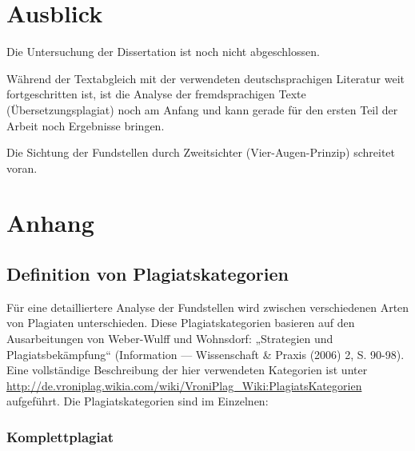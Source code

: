 \documentclass[ngerman,final,fontsize=12pt,paper=a4,twoside,bibliography=totoc,BCOR=8mm,draft=false]{scrartcl}
\begin{document}
\section{%
 Ausblick }

Die Untersuchung der Dissertation ist noch nicht abgeschlossen. 


Während der Textabgleich mit der verwendeten deutschsprachigen Literatur weit fortgeschritten ist, ist die Analyse der fremdsprachigen Texte (Übersetzungsplagiat) noch am Anfang und kann gerade für den ersten Teil der Arbeit noch Ergebnisse bringen. 


Die Sichtung der Fundstellen durch Zweitsichter (Vier-Augen-Prinzip) schreitet voran. 

\section{%
Anhang}
\subsection{%
 Definition von Plagiatskategorien }

Für eine detailliertere Analyse der Fundstellen wird zwischen verschiedenen Arten von Plagiaten unterschieden. Diese Plagiatskategorien basieren auf den Ausarbeitungen von Weber-Wulff und Wohnsdorf: „Strategien und Plagiatsbekämpfung“ (Information --- Wissenschaft \& Praxis (2006) 2, S. 90-98). Eine vollständige Beschreibung der hier verwendeten Kategorien ist unter %
\url{http://de.vroniplag.wikia.com/wiki/VroniPlag_Wiki:PlagiatsKategorien} aufgeführt. Die Plagiatskategorien sind im Einzelnen: 

\subsubsection{%
 Komplettplagiat }
\end{document}
